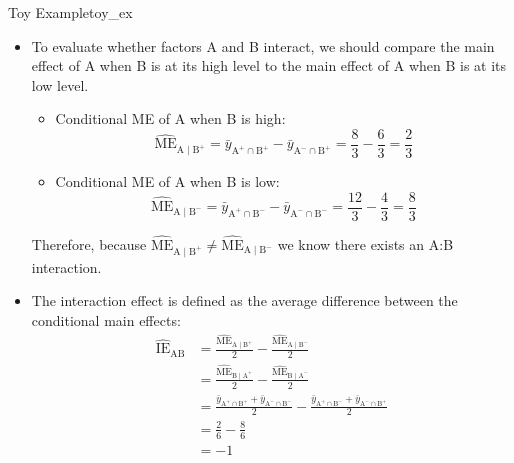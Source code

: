 \begin{Example}{Toy Example}{toy_ex}
\begin{itemize}
\begin{align*}
                         & =\frac{\bar{y}_{\text{A}^-\cap \text{B}^+}+\bar{y}_{\text{A}^+\cap \text{B}^+}}{2}
                        -\frac{\bar{y}_{\text{A}^-\cap \text{B}^-}+\bar{y}_{\text{A}^+\cap \text{B}^-}}{2}    \\
                         & =\frac{(6/3)+(8/3)}{2}-\frac{(4/3)+(12/3)}{2}                                      \\
                         & =-1/3
                  \end{align*}
                  Therefore, we expect the average response to go down by $ 1/3 $ when B is moved from its low to high level.
            \item To evaluate whether factors A and B interact, we should compare the main effect of A when B is at
                  its high level to the main effect of A when B is at its low level.
                  \begin{itemize}
                        \item Conditional ME of A when B is high:
                              \[ \widehat{\text{ME}}_{\text{A}\mid \text{B}^+}=\bar{y}_{\text{A}^+\cap \text{B}^+}-\bar{y}_{\text{A}^-\cap \text{B}^+}=\frac{8}{3}-\frac{6}{3}=\frac{2}{3} \]
                        \item Conditional ME of A when B is low:
                              \[ \widehat{\text{ME}}_{\text{A}\mid \text{B}^-}=\bar{y}_{\text{A}^+\cap \text{B}^-}-\bar{y}_{\text{A}^-\cap \text{B}^-}=\frac{12}{3}-\frac{4}{3} =\frac{8}{3} \]
                  \end{itemize}
                  Therefore, because $ \widehat{\text{ME}}_{\text{A}\mid \text{B}^+}\ne\widehat{\text{ME}}_{\text{A}\mid \text{B}^-} $ we know there exists an A:B interaction.
            \item The interaction effect is defined as the average difference between the conditional main effects:
                  \begin{align*}
                        \widehat{\text{IE}}_{\text{AB}}
                         & =\frac{\widehat{\text{ME}}_{\text{A}\mid \text{B}^+}}{2}-\frac{\widehat{\text{ME}}_{\text{A}\mid \text{B}^-}}{2}                                                     \\
                         & =\frac{\widehat{\text{ME}}_{\text{B}\mid \text{A}^+}}{2}-\frac{\widehat{\text{ME}}_{\text{B}\mid \text{A}^-}}{2}                                                     \\
                         & =\frac{\bar{y}_{\text{A}^+\cap \text{B}^+}+\bar{y}_{\text{A}^-\cap \text{B}^-}}{2}-\frac{\bar{y}_{\text{A}^+\cap \text{B}^-}+\bar{y}_{\text{A}^-\cap \text{B}^+}}{2} \\
                         & =\frac{2}{6}-\frac{8}{6}                                                                                                                                             \\
                         & =-1
                  \end{align*}
      \end{itemize}
\end{Example}
